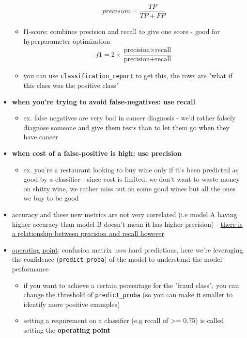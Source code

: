 \documentclass[10.5pt,a4paper, fleqn, dvipsnames]{article}
\begin{document}
\begin{itemize}
\begin{itemize}
\begin{align*}
            precision = \dfrac{TP}{TP + FP}
        \end{align*}
        \item f1-score: combines precision and recall to give one score - good for hyperparameter optimization
        \begin{align*}
            f1 = 2 \times \dfrac{\text{precision} \times \text{recall}}{\text{precision} + \text{recall}}
        \end{align*}
        \item you can use \lstinline{classification_report} to get this, the rows are "what if this class was the positive class" \\
    \end{itemize}
    \item \textbf{when you're trying to avoid false-negatives: use recall}
    \begin{itemize}
        \item ex. false negatives are very bad in cancer diagnosis - we'd rather falsely diagnose someone and give them tests than to let them go when they have cancer
    \end{itemize}
    \item \textbf{when cost of a false-positive is high: use precision}
    \begin{itemize}
        \item ex. you're a restaurant looking to buy wine only if it's been predicted as good by a classifier - since cost is limited, we don't want to waste money on shitty wine, we rather miss out on some good wines but all the ones we buy to be good
    \end{itemize}
    \item accuracy and these new metrics are not very correlated (i.e model A having higher accuracy than model B doesn't mean it has higher precision) - \ul{there is a relationship between precision and recall however}
    \item \ul{operating point}: confusion matrix uses hard predictions, here we're leveraging the confidence (\lstinline{predict_proba}) of the model to understand the model performance
    \begin{itemize}
        \item if you want to achieve a certain percentage for the "fraud class", you can change the threshold of \lstinline{predict_proba} (so you can make it smaller to identify more positive examples)
        \item setting a requirement on a classifier (e.g recall of >= 0.75) is called setting the \textbf{operating point}

\end{itemize}
\end{itemize}
\end{document}
